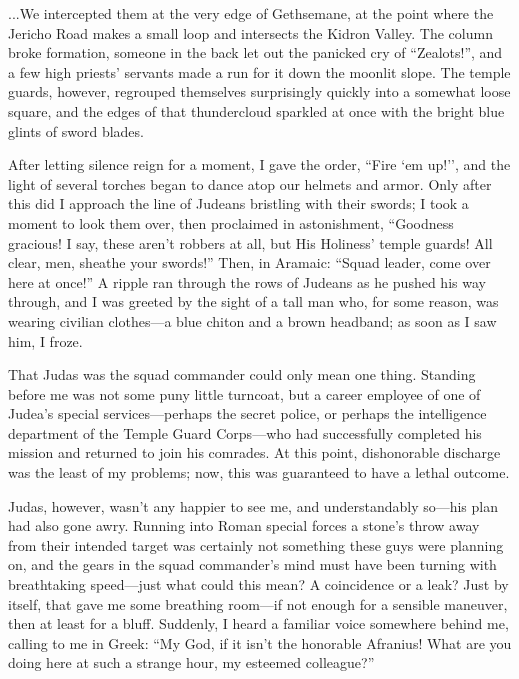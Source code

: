 ...We intercepted them at the very edge of Gethsemane, at the point where the Jericho Road makes a small loop and intersects the Kidron Valley. The column broke formation, someone in the back let out the panicked cry of ``Zealots!'', and a few high priests' servants made a run for it down the moonlit slope. The temple guards, however, regrouped themselves surprisingly quickly into a somewhat loose square, and the edges of that thundercloud sparkled at once with the bright blue glints of sword blades.

After letting silence reign for a moment, I gave the order, ``Fire `em up!'', and the light of several torches began to dance atop our helmets and armor. Only after this did I approach the line of Judeans bristling with their swords; I took a moment to look them over, then proclaimed in astonishment, ``Goodness gracious! I say, these aren't robbers at all, but His Holiness' temple guards! All clear, men, sheathe your swords!'' Then, in Aramaic: ``Squad leader, come over here at once!'' A ripple ran through the rows of Judeans as he pushed his way through, and I was greeted by the sight of a tall man who, for some reason, was wearing civilian clothes---a blue chiton and a brown headband; as soon as I saw him, I froze.

That Judas was the squad commander could only mean one thing. Standing before me was not some puny little turncoat, but a career employee of one of Judea's special services---perhaps the secret police, or perhaps the intelligence department of the Temple Guard Corps---who had successfully completed his mission and returned to join his comrades. At this point, dishonorable discharge was the least of my problems; now, this was guaranteed to have a lethal outcome.

Judas, however, wasn't any happier to see me, and understandably so---his plan had also gone awry. Running into Roman special forces a stone's throw away from their intended target was certainly not something these guys were planning on, and the gears in the squad commander's mind must have been turning with breathtaking speed---just what could this mean? A coincidence or a leak? Just by itself, that gave me some breathing room---if not enough for a sensible maneuver, then at least for a bluff. Suddenly, I heard a familiar voice somewhere behind me, calling to me in Greek: ``My God, if it isn't the honorable Afranius! What are you doing here at such a strange hour, my esteemed colleague?''

